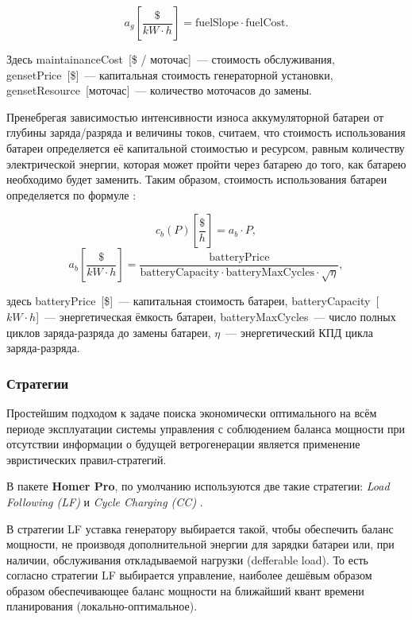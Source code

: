 \begin{equation}\label{f:ag}
a_g \left[ \frac{\$}{kW\cdot h} \right] = 
\text{fuelSlope} \cdot \text{fuelCost}.
\end{equation}

Здесь maintainanceCost~[\$ / моточас]~--- стоимость обслуживания,\\ 
gensetPrice~[\$]~--- капитальная стоимость генераторной установки,\\
gensetResource~[моточас]~--- количество моточасов до замены.

Пренебрегая зависимостью интенсивности износа аккумуляторной батареи от глубины заряда/разряда и величины токов, считаем, что стоимость использования батареи определяется её капитальной стоимостью и ресурсом, равным количеству электрической энергии, которая может пройти через батарею до того, как батарею необходимо будет заменить.
Таким образом, стоимость использования батареи определяется по формуле \cite{bwc}:


\begin{equation}\label{f:cb}
c_b(P) \left[\frac{\$}{h} \right] = 
a_b \cdot P,
\end{equation}
\begin{equation}\label{f:ab}
a_b \left[ \frac{\$}{kW\cdot h} \right] =
\frac{\text{batteryPrice}}{\text{batteryCapacity} \cdot \text{batteryMaxCycles} 
\cdot \sqrt{\eta}} ,
\end{equation}

здесь batteryPrice~[\$]~--- капитальная стоимость батареи, batteryCapacity~[$kW\cdot h$]~--- энергетическая ёмкость батареи, batteryMaxCycles~--- число полных циклов заряда-разряда до замены батареи, $\eta$~--- энергетический КПД цикла заряда-разряда.

\subsubsection{Стратегии}

Простейшим подходом к задаче поиска экономически оптимального на всём периоде эксплуатации системы управления с соблюдением баланса мощности при отсутствии информации о будущей ветрогенерации является применение эвристических правил-стратегий.

В пакете \textbf{Homer Pro}, по умолчанию используются две такие стратегии: \textit{Load Following (LF)} \cite{lf} и \textit{Cycle Charging (CC)} \cite{cc}.

В стратегии LF уставка генератору выбирается такой, чтобы обеспечить баланс мощности, не производя дополнительной энергии для зарядки батареи или, при наличии, обслуживания откладываемой нагрузки (defferable load).
То есть согласно стратегии LF выбирается управление, наиболее дешёвым образом образом обеспечивающее баланс мощности на ближайший квант времени планирования (локально-оптимальное).

